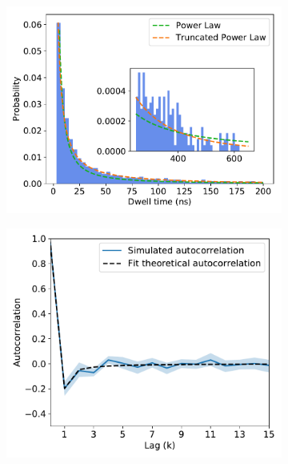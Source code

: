 \documentclass{article}
\begin{document}
\begin{figure}[h]
\begin{subfigure}{0.3\textwidth}
  \includegraphics[width=\textwidth]{ACH_powerlaw.pdf}
  \caption{}\label{fig:ACH_powerlaw}
  \end{subfigure}
  \begin{subfigure}{0.3\textwidth}
  \includegraphics[width=\textwidth]{ACH_hop_acf.pdf}
  \caption{}\label{fig:ACH_hop_acf}
  \end{subfigure}
  \begin{subfigure}{0.3\textwidth}

\end{subfigure}
\end{figure}
\end{document}
